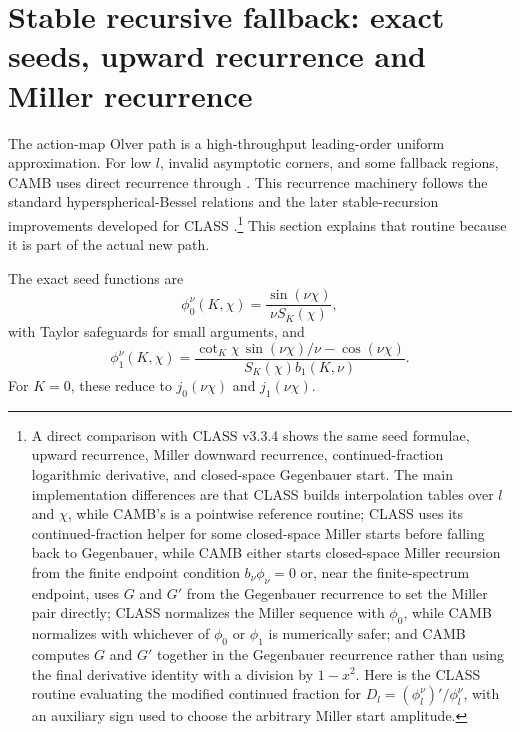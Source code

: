 \documentclass[11pt,a4paper]{article}
\newcommand{\code}[1]{\texttt{\detokenize{#1}}}
\newcommand{\SK}{S_K}
\newcommand{\cotK}{\cot_K}
\begin{document}
\section{Stable recursive fallback: exact seeds, upward recurrence and Miller recurrence}

The action-map Olver path is a high-throughput leading-order uniform approximation.  For low \(l\), invalid asymptotic corners, and some fallback regions, CAMB uses direct recurrence through \code{phi_recurs}.  This recurrence machinery follows the standard hyperspherical-Bessel relations and the later stable-recursion improvements developed for \textsc{CLASS} \cite{abbott-schaefer,tram2013,lesgourgues-tram2013}.\footnote{A direct comparison with \textsc{CLASS} v3.3.4 shows the same seed formulae, upward recurrence, Miller downward recurrence, continued-fraction logarithmic derivative, and closed-space Gegenbauer start.  The main implementation differences are that \textsc{CLASS} builds interpolation tables over \(l\) and \(\chi\), while CAMB's \code{phi_recurs} is a pointwise reference routine; \textsc{CLASS} uses its \code{get_CF1} continued-fraction helper for some closed-space Miller starts before falling back to Gegenbauer, while CAMB either starts closed-space Miller recursion from the finite endpoint condition \(b_\nu\phi_\nu=0\) or, near the finite-spectrum endpoint, uses \(G\) and \(G'\) from the Gegenbauer recurrence to set the Miller pair directly; \textsc{CLASS} normalizes the Miller sequence with \(\phi_0\), while CAMB normalizes with whichever of \(\phi_0\) or \(\phi_1\) is numerically safer; and CAMB computes \(G\) and \(G'\) together in the Gegenbauer recurrence rather than using the final derivative identity with a division by \(1-x^2\).  Here \code{get_CF1} is the \textsc{CLASS} routine evaluating the modified continued fraction for \(D_l=(\phi_l^\nu)'/\phi_l^\nu\), with an auxiliary sign used to choose the arbitrary Miller start amplitude.}  This section explains that routine because it is part of the actual new path.

The exact seed functions are
\begin{equation}
  \phi_0^\nu(K,\chi)=\frac{\sin(\nu\chi)}{\nu\SK(\chi)},
  \label{eq:phi0}
\end{equation}
with Taylor safeguards for small arguments, and
\begin{equation}
  \phi_1^\nu(K,\chi)=
  \frac{\cotK\chi\,\sin(\nu\chi)/\nu-\cos(\nu\chi)}{\SK(\chi)b_1(K,\nu)}.
  \label{eq:phi1}
\end{equation}
For \(K=0\), these reduce to \(j_0(\nu\chi)\) and \(j_1(\nu\chi)\).
\end{document}

